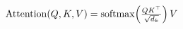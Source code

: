 \documentclass[preview]{standalone}
\begin{document}
\begin{align*}
\special{dvisvgm:raw <g id='unique000'>}\mathrm{Attention}(Q,K,V)=\mathrm{softmax}\!\left(\tfrac{QK^\top}{\sqrt{d_k}}\right)V\special{dvisvgm:raw </g>}
\end{align*}
\end{document}
